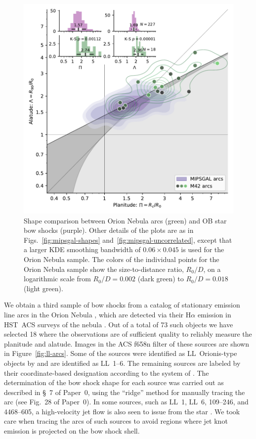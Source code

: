 \documentclass[useAMS, usenatbib, a4paper]{mnras}
\begin{document}
\begin{figure}
  \centering
  \includegraphics[width=\linewidth]{figs/mipsgal-Rc-R90-vs-Orion-R0-D}
  \vspace*{-\baselineskip}
  \caption[]{Shape comparison between Orion Nebula arcs (green) and OB
    star bow shocks (purple).  Other details of the plots are as in
    Figs.~\ref{fig:mipsgal-shapes} and~\ref{fig:mipsgal-uncorrelated},
    except that a larger KDE smoothing bandwidth of
    \(0.06 \times 0.045\) is used for the Orion Nebula sample.  The colors
    of the individual points for the Orion Nebula sample show the
    size-to-distance ratio, \(R_0/D\), on a logarithmic scale from
    \(R_0/D = 0.002\) (dark green) to \(R_0/D = 0.018\) (light
    green).}
  \label{fig:ll-compare-mipsgal}
\end{figure}


We obtain a third sample of bow shocks from a catalog of stationary
emission line arcs in the Orion Nebula \citep{Bally:2000a}, which are
detected via their H\(\alpha\) emission in HST~ACS surveys of the nebula
\citep{Bally:2006a, Robberto:2013a}.  Out of a total of 73 such
objects \citep{Gutierrez-Soto:2015a} we have selected 18 where the
observations are of sufficient quality to reliably measure the
planitude and alatude.  Images in the ACS f658n filter of these
sources are shown in Figure~\ref{fig:ll-arcs}.  Some of the sources
were identified as LL~Orionis-type objects by \citet{Bally:2001a} and
are identified as LL~1--6. The remaining sources are labeled by their
coordinate-based designation according to the system of
\citet{ODell:1994a}.  The determination of the bow shock shape for
each source was carried out as described in \S~7 of Paper~0, using the
``ridge'' method for manually tracing the arc (see Fig.~28 of
Paper~0).  In some sources, such as LL~1, LL~6, 109--246, and 4468--605,
a high-velocity jet flow is also seen to issue from the star
\citep{Bally:2006a, Henney:2013a}.  We took care when tracing the arcs
of such sources to avoid regions where jet knot emission is projected
on the bow shock shell.
\end{document}
